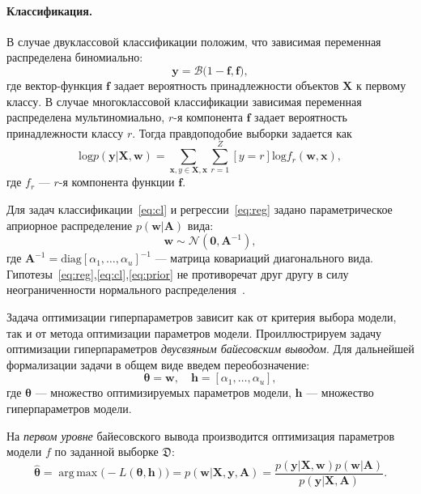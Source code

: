 \documentclass[12pt]{article}
\DeclareMathOperator*{\argmax}{arg\,max}
\begin{document}
\paragraph{Классификация. }
В случае двуклассовой классификации положим, что зависимая переменная распределена биномиально:
\begin{equation}
\label{eq:cl}
	\mathbf{y} = \mathcal{B}\bigl(1-\mathbf{f}, \mathbf{f}\bigr),
\end{equation}
где вектор-функция $\mathbf{f}$ задает вероятность принадлежности объектов $\mathbf{X}$ к первому классу.
В случае многоклассовой классификации зависимая переменная распределена мультиномиально, $r$-я компонента $\mathbf{f}$ задает вероятность принадлежности классу $r$.
Тогда правдоподобие выборки задается как 
\[
	\text{log}p(\mathbf{y}|\mathbf{X}, \mathbf{w}) = \sum_{\mathbf{x}, y \in \mathbf{X}, \mathbf{x}} \sum_{r=1}^Z[y=r] \text{log}{f}_r(\mathbf{w}, \mathbf{x}),
\] 
где ${f}_r$ --- $r$-я компонента функции $\mathbf{f}$.

Для задач классификации~\eqref{eq:cl} и регрессии~\eqref{eq:reg} задано параметрическое априорное распределение $p(\mathbf{w}|\mathbf{A})$ вида:
\begin{equation}
\label{eq:prior}
	\mathbf{w} \sim \mathcal{N}(\mathbf{0}, \mathbf{A}^{-1}),
\end{equation}
где $\mathbf{A}^{-1} = \text{diag}[\alpha_1, \dots, \alpha_u]^{-1}$ --- матрица ковариаций диагонального вида. Гипотезы~\eqref{eq:reg},\eqref{eq:cl},\eqref{eq:prior} не противоречат друг другу в силу неограниченности нормального распределения~\cite{bayes_constr}. 

Задача оптимизации гиперпараметров зависит как от критерия выбора модели, так и от метода оптимизации параметров модели.
Проиллюстрируем задачу оптимизации гиперпараметров \textit{двусвзяным байесовским выводом}. Для дальнейшей формализации задачи в общем виде введем переобозначение:
\begin{equation}
\label{eq:bayes0}
	\boldsymbol{\theta} = \mathbf{w}, \quad \mathbf{h} = [\alpha_1, \dots, \alpha_u],	
\end{equation}
где $\boldsymbol{\theta}$ --- множество оптимизируемых параметров модели, $\mathbf{h}$ --- множество гиперпараметров модели.

На \textit{первом уровне} байесовского вывода производится оптимизация параметров модели $f$ по заданной выборке $\mathfrak{D}$:
\begin{equation}
\label{eq:bayes1}
\hat{\boldsymbol{\theta}} = \argmax \bigl(-L(\boldsymbol{\theta}, \mathbf{h})\bigr) = p(\mathbf{w}|\mathbf{X}, \mathbf{y}, \mathbf{A}) = \frac{p(\mathbf{y}|\mathbf{X},\mathbf{w})p(\mathbf{w}|\mathbf{A})}{p(\mathbf{y}|\mathbf{X},\mathbf{A})}.
\end{equation}
\end{document}
